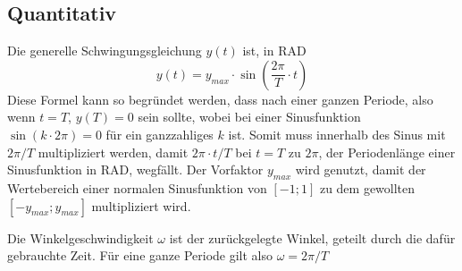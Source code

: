 \documentclass{article}
\begin{document}
\subsection{Quantitativ}
Die generelle Schwingungsgleichung $y(t)$ ist, in RAD
\[
 y(t) = y_{max} \cdot \sin{\left(\frac{2\pi}{T} \cdot t\right)}
\]
Diese Formel kann so begründet werden, dass nach einer ganzen Periode, also wenn $t=T$, $y(T)=0$ sein sollte, wobei bei einer Sinusfunktion $\sin{(k \cdot 2\pi)} = 0$ für ein ganzzahliges $k$ ist. Somit muss innerhalb des Sinus mit $2\pi / T$ multipliziert werden, damit $2\pi \cdot t/T$ bei $t=T$ zu $2\pi$, der Periodenlänge einer Sinusfunktion in RAD, wegfällt. \newline
Der Vorfaktor $y_{max}$ wird genutzt, damit der Wertebereich einer normalen Sinusfunktion von $[-1; 1]$ zu dem gewollten $[-y_{max}; y_{max}]$ multipliziert wird. 
 
Die Winkelgeschwindigkeit $\omega$ ist der zurückgelegte Winkel, geteilt durch die dafür gebrauchte Zeit. Für eine ganze Periode gilt also $\omega = 2\pi /T$
\end{document}
